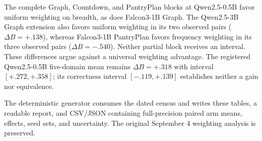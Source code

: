 \begin{table}[H]
  \centering
  \caption{\textbf{Uniform versus fresh-frequency replay at pass 8.}
  Effects are uniform minus frequency weighting. Brackets give the paired
  percentile bootstrap interval for $\Delta B$ over all $5^5$ ordered
  resamples in complete blocks. Every observed treatment endpoint in this
  snapshot passes the persisted replay-weight telemetry audit. Partial
  blocks remain descriptive; Qwen2.5-3B PantryPlan has no terminal pair.}
  \label{tab:current-e120}
  \scriptsize
  \setlength{\tabcolsep}{3pt}
\end{table}

The complete Graph, Countdown, and PantryPlan blocks at Qwen2.5-0.5B
favor uniform weighting on breadth, as does Falcon3-1B Graph. The
Qwen2.5-3B Graph extension also favors uniform weighting in its two observed
pairs ($\Delta B=+.138$), whereas Falcon3-1B PantryPlan favors frequency
weighting in its three observed pairs ($\Delta B=-.540$). Neither partial
block receives an interval. These differences argue against a universal
weighting advantage. The registered Qwen2.5-0.5B five-domain mean remains
$\Delta B=+.318$ with interval $[+.272,+.358]$; its correctness interval
$[-.119,+.139]$ establishes neither a gain nor equivalence.

The deterministic generator
 consumes the
dated census and writes these tables, a readable report, and CSV/JSON
containing full-precision paired arm means, effects, seed sets, and
uncertainty. The original September 4 weighting analysis is preserved.
